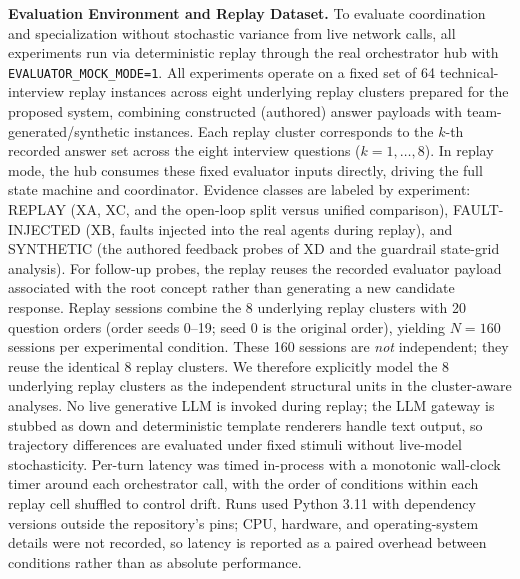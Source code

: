 \documentclass[runningheads]{llncs}
\begin{document}
\textbf{Evaluation Environment and Replay Dataset.} To evaluate coordination and specialization without stochastic variance from live network calls, all experiments run via deterministic replay through the real orchestrator hub with \texttt{EVALUATOR\_MOCK\_MODE=1}. All experiments operate on a fixed set of 64 technical-interview replay instances across eight underlying replay clusters prepared for the proposed system, combining constructed (authored) answer payloads with team-generated/synthetic instances. Each replay cluster corresponds to the $k$-th recorded answer set across the eight interview questions ($k=1,\ldots,8$). In replay mode, the hub consumes these fixed evaluator inputs directly, driving the full state machine and coordinator. Evidence classes are labeled by experiment: REPLAY (XA, XC, and the open-loop split versus unified comparison), FAULT-INJECTED (XB, faults injected into the real agents during replay), and SYNTHETIC (the authored feedback probes of XD and the guardrail state-grid analysis). For follow-up probes, the replay reuses the recorded evaluator payload associated with the root concept rather than generating a new candidate response. Replay sessions combine the 8 underlying replay clusters with 20 question orders (order seeds 0--19; seed 0 is the original order), yielding $N=160$ sessions per experimental condition. These 160 sessions are \emph{not} independent; they reuse the identical 8 replay clusters. We therefore explicitly model the 8 underlying replay clusters as the independent structural units in the cluster-aware analyses. No live generative LLM is invoked during replay; the LLM gateway is stubbed as down and deterministic template renderers handle text output, so trajectory differences are evaluated under fixed stimuli without live-model stochasticity. Per-turn latency was timed in-process with a monotonic wall-clock timer around each orchestrator call, with the order of conditions within each replay cell shuffled to control drift. Runs used Python 3.11 with dependency versions outside the repository's pins; CPU, hardware, and operating-system details were not recorded, so latency is reported as a paired overhead between conditions rather than as absolute performance.
\end{document}
